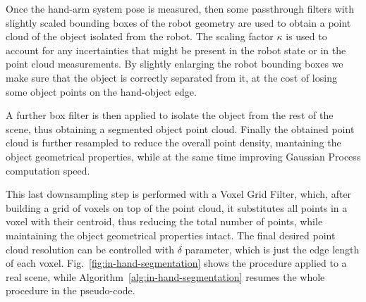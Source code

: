 Once the hand-arm  system pose is measured, then
some   passthrough filters with slightly  scaled bounding boxes of  the robot
geometry  are used  to obtain  a  point cloud  of  the object  isolated from  the
robot. The scaling factor $\kappa$ is used to account for any incertainties that might
be present in the robot state or in the point cloud measurements. 
By slightly enlarging the robot bounding boxes we make sure that the object is correctly
separated from it, at the cost of losing some object points on the hand-object edge.

A further box filter is then applied to isolate the object from the rest of the scene,
thus obtaining a segmented object point cloud. 
Finally the obtained point cloud is further resampled to reduce the overall point
density, mantaining the object geometrical properties, while at the same time
improving Gaussian Process computation speed. 

This last downsampling step is performed with a Voxel Grid Filter, which, after
building a grid of voxels on top of the point cloud, it
substitutes all points in a voxel with their centroid, thus reducing the total number of 
points, while maintaining the object geometrical properties intact. The final desired
point cloud resolution can be controlled with $\delta$ parameter, which is just the edge length of each voxel.
Fig.~\ref{fig:in-hand-segmentation} shows the procedure applied to a real scene,
while  Algorithm~\ref{alg:in-hand-segmentation} resumes  the whole  procedure in
the pseudo-code.


